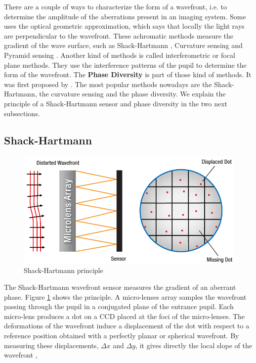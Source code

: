 There are a couple of ways to characterize the form of a wavefront, i.e. to determine the amplitude of the aberrations present in an imaging system. Some uses the optical geometric approximation, which says that locally the light rays are perpendicular to the wavefront. These achromatic methods measure the gradient of the wave surface, such as Shack-Hartmann \citep{hartmann1900,ShackPlatt_1971,fontanella1985}, Curvature sensing \citep{Roddier1988} and Pyramid sensing \citep{ragazzoni1996}. Another kind of methods is called interferometric or focal plane methods. They use the interference patterns of the pupil to determine the form of the wavefront. The \textbf{Phase Diversity} is part of those kind of methods. It was first proposed by \citet{Gonsalves_1982}. The most popular methods nowadays are the Shack-Hartmann, the curvature sensing and the phase diversity. We explain the principle of a Shack-Hartmann sensor and phase diversity in the two next subsections.


\subsection[Shack-Hartmann]{Shack-Hartmann \citep{hartmann1900,ShackPlatt_1971}}
\label{subsec:SHprinciple}

\begin{figure}
\begin{center}
\includegraphics[width=\textwidth,angle=0]{Figures/SHWFSPrinciple}
\decoRule
\caption[Shack-Hartmann principle]{Shack-Hartmann principle \citep{SHWFS}}
\label{fig:SHWFSPrinciple}
\end{center}
\end{figure}

The Shack-Hartmann wavefront sensor measures the gradient of an aberrant phase. Figure \ref{fig:SHWFSPrinciple} shows the principle. A micro-lenses array samples the wavefront passing through the pupil in a conjugated plane of the entrance pupil. Each micro-lens produces a dot on a CCD placed at the foci of the micro-lenses. The deformations of the wavefront induce a displacement of the dot with respect to a reference position obtained with a perfectly planar or spherical wavefront. By measuring these displacements, $\Delta x$ and $\Delta y$, it gives directly the local slope of the wavefront \citep{fontanella1985},


